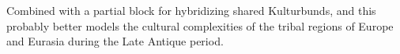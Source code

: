 \documentclass{article}
\newcommand{\wtwsms}{\textit{WtWSMS}}
\begin{document}
	Combined with a partial block for hybridizing shared Kulturbunds, and this probably better models the cultural complexities of the tribal regions of Europe and Eurasia during the Late Antique period.
	
	\begin{comment}
		\subsection{Oghuric Cultures}
		\label{sec:culture_review:subsec:oghur_cultures}
		With the above Kulturbund work, we should revisit the western Turkic or "Oghuric" cultures and related, including the Ugric speaking Magyars.
		
		First, there's a number of discrepancies in the \wtwsms codebase and what the mod implements:  there are separate cultures for Huns, Utigur, Kutrigur, Barsils, Bolghars, and Hunno-Bulgars, but with the \wtwsms mod only Bolghars, Barsils, and Huns make an appearance.
		Adding to the confusion is the exact rise of the Bolghars; we have some references in Armenian chronicles as early as the late IVth century, but the clearer references arise during the second reign of Zeno in the 480s.
		It is also clear that there was some continuity between the two groups because of how nomadic steppe people evolve and readily flow into one another.
		
		A debate exists on the ethnogenesis of the Oghurs; some, like Kim \cite{KimHuns}, argue for a strict continuity between the Huns, Oghurs, and Bolghars.
		Additionally, the relatively early estimates for the split between Oghur and Oghuz Turkic ca. 2100 YBP (i.e., 150 BC) \cite{TurkicComputationalLinguistics}.
		Contemporaneously, several Saka-Scythian material cultures in Central Asia declined, including Korgantas, which fell into the Xiongu sphere of influence. 
		Thus, it is defensible to argue that the Ogur/Oghuz split was precipated by the rise of the Xiongnu, and linking the Huns and Xiongnu, while a matter of debate, seems to be the most common position, despite counterarguments (see \cite{OttoHuns} for a good counter-argument).
		
		That said, there was a nearly a 200 year interregnum between the fall of the Xiongnu and the rise of the Huns. 
		The author thinks that period where the Oghurs displaced the Saka in the region from the Caspian to the Balkhash in the Eurasian Steppe Belt, playing a role in the formation of later cultures like the Sargat and Gorokhovo cultures.
		Given evidence linking the Sargat to the Xiongnu and Gorokhovo to the Magyars \cite{MagyarGenetics}, would put the Magyars at the boundary between the Irano-Turkic stepp and the Ugro-Permian peoples.
		

\end{comment}
\end{document}
